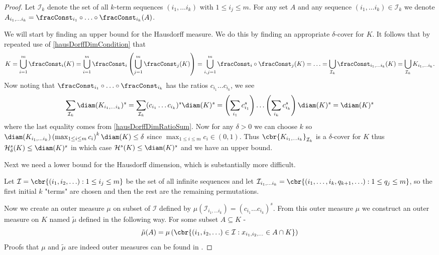 \begin{proof}
	Let $\mathcal{I}_k$ denote the set of all $k$-term sequences $(i_1, \ldots i_k)$ with $1 \leq i_j \leq m$. For any set $A$ and any sequence $(i_1, \ldots i_k)\in \mathcal{I}_k$ we denote $A_{i_1, \ldots i_k} = \fracConst_{i_1} \circ \ldots \circ \fracConst_{i_k}(A)$.
	
	We will start by finding an upper bound for the Hausdorff measure. We do this by finding an appropriate $\delta$-cover for $K$. It follows that by repeated use of \eqref{hausDorffDimCondition} that
	\begin{align}
		K = \bigcup_{i = 1}^{m} \fracConst_i(K) =\bigcup_{i = 1}^{m} \fracConst_i \left(\bigcup_{j = 1}^{m} \fracConst_j(K) \right) = \bigcup_{i, j =1}^{m} \fracConst_i \circ \fracConst_j (K) = \ldots =  \bigcup_{\mathcal{I}_k} \fracConst_{i_1, \ldots i_k}(K) =    \bigcup_{\mathcal{I}_k} K_{i_1, \ldots i_k}.
	\end{align}
	Now noting that $\fracConst_{i_1} \circ \ldots \circ \fracConst_{i_k}$ has the ratios $c_{i_1} \dots c_{i_k}$, we see
	\begin{equation}
		\sum_{\mathcal{I}_k} \diam(K_{i_1, \ldots i_k})^{s} = \sum_{\mathcal{I}_k} (c_{i_1} \dots c_{i_k})^{s} \diam(K)^{s} = \left(\sum_{i_1} c_{i_1}^{s}\right) \dots \left(\sum_{i_k}c_{i_k}^{s}\right) \diam(K)^{s} = \diam(K)^{s}
	\end{equation}
	where the last equality comes from \eqref{hausDorffDimRatioSum}. Now for any $\delta > 0$ we can choose $k$ so \newline $\diam(K_{i_1, \ldots i_k}) \left(\max_{1 \leq i \leq m} c_i\right)^{k}\diam(K) \leq \delta$ since $\max_{1 \leq i \leq m} c_i \in (0,1)$. Thus $\cbr{K_{i_1, \ldots i_k}}_{\mathcal{I}_k}$ is a $\delta$-cover for $K$ thus $\mathcal{H}_{\delta}^{s}(K) \leq \diam(K)^{s}$ in which case $\mathcal{H}^{s}(K) \leq \diam(K)^{s}$ and we have an upper bound.
	
	Next we need a lower bound for the Hausdorff dimension, which is substantially more difficult. 
	
	Let $\mathcal{I} = \cbr{(i_1, i_2, \ldots) : 1 \leq i_j \leq m}$ be the set of all infinite sequences and let \newline $\mathcal{I}_{i_1, \ldots i_k} = \cbr{(i_1, \ldots , i_k, q_{k+1}, \ldots ) : 1 \leq q_j \leq m}$, so the first initial $k$ "terms" are chosen and then the rest are the remaining permutations.
	
	Now we create an outer measure $\mu$ on subset of $\mathcal{I}$ defined by $\mu(\mathcal{I}_{i_1, \ldots i_k}) = (c_{i_1} \dots c_{i_k})^{s}$. From this outer measure $\mu$ we construct an outer measure on $K$ named $\tilde{\mu}$ defined in the following way. For some subset $A \subseteq K$
-	\begin{equation}
		\tilde{\mu}(A) = \mu \left(\cbr{(i_1, i_2, \ldots)\in \mathcal{I} : x_{i_1, i_2, \ldots} \in A \cap K}\right)
	\end{equation}  Proofs that $\mu$ and $\tilde{\mu}$ are indeed outer measures can be found in \cite[Section 7]{mona}.
	

\end{proof}
